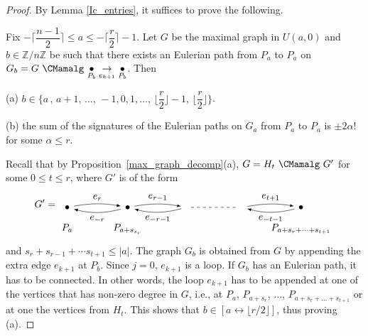 \documentclass{amsproc}
\theoremstyle{definition}
\theoremstyle{remark}
\numberwithin{equation}{section}
\newcommand{\Z}{{\mathbb Z}}
\newcommand{\nodeDist}{2}
\newcommand{\interval}{\longleftrightarrow}
\begin{document}
\begin{proof}

By Lemma \ref{Ic_entries}, it suffices to prove the following.

\smallskip

Fix $-\lceil \dfrac{n-1}{2} \rceil \leqslant a\leqslant -\lceil \dfrac{r}{2} \rceil-1$. Let $G$ be the maximal graph in $U(a,0)$ and $b\in \Z/n\Z$ be such that there exists an Eulerian path from $P_a$ to $P_a$ on $G_b=G\ \CMamalg\ \underset {P_b} \bullet \underset {e_{k+1}} \rightarrow \underset {P_{b}} \bullet$. 
Then 

\smallskip
(a) $b\in\{a \, , \, a+1, \, \ldots, \, -1, 0, 1, \ldots, \, \lfloor \dfrac{r}{2} \rfloor - 1, \, \lfloor \dfrac{r}{2} \rfloor\}$. 

\smallskip
(b) the sum of the signatures of the Eulerian paths on $G_a$ from $P_a$ to $P_a$ is $\pm 2\alpha!$ for some $\alpha\leqslant r$.

\smallskip
Recall that by Proposition~\ref{max_graph_decomp}(a), $G=H_t\ \CMamalg\ G'$ 
for some $0 \leqslant t\leqslant r$, where $G'$ is of the form
\[G'=
\begin{tikzpicture}[baseline,vertex/.style={anchor=base, circle, fill,minimum size=4pt, inner sep=0pt, outer sep=0pt},auto,
                               edge/.style={->,>=latex, shorten > = 5pt,shorten < = 5pt},
position/.style args={#1:#2 from #3}{
    at=(#3.#1), anchor=#1+180, shift=(#1:#2)
}]
  \node[vertex] (v1) {};
  \node[vertex,position = 0:{\nodeDist} from v1] (v2) {};
  \coordinate[position = 0:{\nodeDist} from v2] (v3);
  \coordinate[position = 0:{\nodeDist} from v3] (v4) {};
  \node[vertex,position = 0:{\nodeDist} from v4] (v5) {};

  \draw (v1) node[below = 13] {$P_a$};
  \draw (v2) node[below = 13] {$P_{a+s_{s_r}}$};
  \draw (v5) node[below = 13] {$P_{a+s_{r}+\dots+s_{t + 1}}$};

  \draw[edge] (v1) to [bend left=10] node[above] {$e_{r}$} (v2);
  \draw[edge] (v2) to [bend left=15] node[below] {$e_{-r}$} (v1);

  \draw[edge] (v2) to [bend left=10] node[above] {$e_{r - 1}$} (v3);
  \draw[edge] (v3) to [bend left=15] node[below] {$e_{-r - 1}$} (v2);

  \draw[dashed,shorten > = 5pt, shorten < = 5pt] (v3) -- (v4);

  \draw[edge] (v4) to [bend left=10] node[above] {$e_{t + 1}$} (v5);
  \draw[edge] (v5) to [bend left=15] node[below] {$e_{-t - 1}$} (v4);
\end{tikzpicture}
\]
and $s_{r}+s_{r-1}+\cdots s_{t + 1} \leqslant |a|$. The graph $G_b$ is obtained from $G$ by appending the extra edge $e_{k+1}$ at $P_b$.
Since $j = 0$, $e_{k+1}$ is a loop. If $G_b$ has an Eulerian path, it has to be connected. In other words, the loop $e_{k+1}$ has to be appended at
one of the vertices that has non-zero degree in $G$, i.e., at $P_a$, $P_{a + s_r}$, $\ldots$, $P_{a + s_r + \ldots + s_{t + 1}}$ or at
one the vertices from $H_t$. This shows that $b\in [a \interval \lfloor r/2 \rfloor]$, thus proving (a). 


\end{proof}
\end{document}
